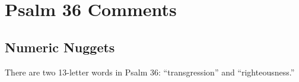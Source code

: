 \section{Psalm 36 Comments}

\subsection{Numeric Nuggets}
There are two 13-letter words in Psalm 36: ``transgression'' and ``righteousness.''